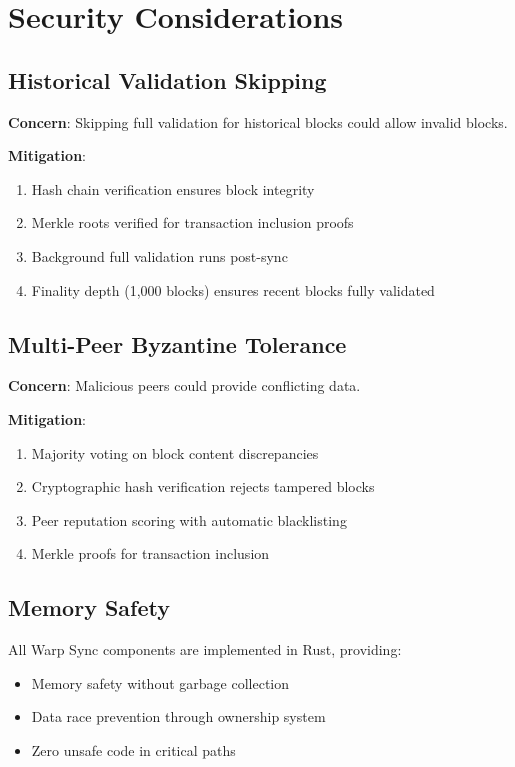 \documentclass[11pt,a4paper]{article}
\begin{document}
\section{Security Considerations}

\subsection{Historical Validation Skipping}

\textbf{Concern}: Skipping full validation for historical blocks could allow invalid blocks.

\textbf{Mitigation}:
\begin{enumerate}
    \item Hash chain verification ensures block integrity
    \item Merkle roots verified for transaction inclusion proofs
    \item Background full validation runs post-sync
    \item Finality depth (1,000 blocks) ensures recent blocks fully validated
\end{enumerate}

\subsection{Multi-Peer Byzantine Tolerance}

\textbf{Concern}: Malicious peers could provide conflicting data.

\textbf{Mitigation}:
\begin{enumerate}
    \item Majority voting on block content discrepancies
    \item Cryptographic hash verification rejects tampered blocks
    \item Peer reputation scoring with automatic blacklisting
    \item Merkle proofs for transaction inclusion
\end{enumerate}

\subsection{Memory Safety}

All Warp Sync components are implemented in Rust, providing:
\begin{itemize}
    \item Memory safety without garbage collection
    \item Data race prevention through ownership system
    \item Zero unsafe code in critical paths
\end{itemize}
\end{document}
